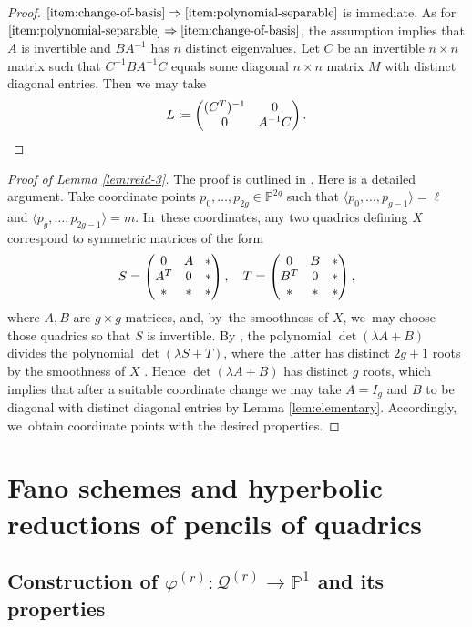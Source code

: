 \documentclass[10pt,a4paper]{amsart}
\theoremstyle{plain}
\theoremstyle{definition}
\let\phi\varphi
\renewcommand\P{\mathbb{P}}
\begin{document}
\begin{proof}
$\eqref{item:change-of-basis}\Rightarrow\eqref{item:polynomial-separable}$
is immediate.
As for $\eqref{item:polynomial-separable}\Rightarrow\eqref{item:change-of-basis}$,
the assumption implies that $A$ is invertible and $BA^{-1}$ has $n$ distinct eigenvalues.
Let $C$ be an invertible $n\times n$ matrix such that $C^{-1}BA^{-1}C$ equals some diagonal $n\times n$ matrix $M$ with distinct diagonal entries.
Then we may take
\[
L \coloneqq \begin{pmatrix}(C^T)^{-1} & 0\\
0& A^{-1}C\end{pmatrix}.\qedhere
\]
\end{proof}
\begin{proof}[Proof of Lemma \ref{lem:reid-3}]
The proof is outlined in
\cite[p.\,44]{Reid-thesis}.
Here is a detailed argument.
Take coordinate points $p_0,\dots, p_{2g}\in \P^{2g}$ such that $\langle p_0,\dots,p_{g-1}\rangle =\ell$ and $\langle p_g,\dots,p_{2g-1}\rangle =m$. In~these coordinates, any two quadrics defining $X$ correspond to symmetric matrices of the form
\[\arraycolsep4.5pt
S=
\begin{pmatrix}
0 & A & *\\
A^T & 0 & *\\
* & * & *
\end{pmatrix}, \quad
T=\begin{pmatrix}
0 & B & *\\
B^T & 0 & *\\
* & * & *
\end{pmatrix},
\]
where $A, B$ are $g\times g$ matrices,
and, by~the smoothness of $X$, we~may choose those quadrics so that $S$ is invertible.
By \cite[Cor.\,3.7]{Reid-thesis}, the polynomial $\det(\lambda A+B)$ divides the polynomial $\det(\lambda S+ T)$,
where the latter has distinct $2g+1$ roots by the smoothness of $X$ \cite[Prop.\,2.1]{Reid-thesis}.
Hence $\det(\lambda A+ B)$ has distinct $g$ roots, which implies that after a suitable coordinate change
we may take $A=I_g$ and $B$ to be diagonal with distinct diagonal entries by Lemma \ref{lem:elementary}.
Accordingly, we~obtain coordinate points with the desired properties.
\end{proof}

\section{Fano schemes and hyperbolic reductions of pencils of quadrics}
\subsection{Construction of $\phi^{(r)}\colon\mathcal{Q}^{(r)}\to\P^1$ and its properties}\label{sec:Q^(r)-construction}
\end{document}
